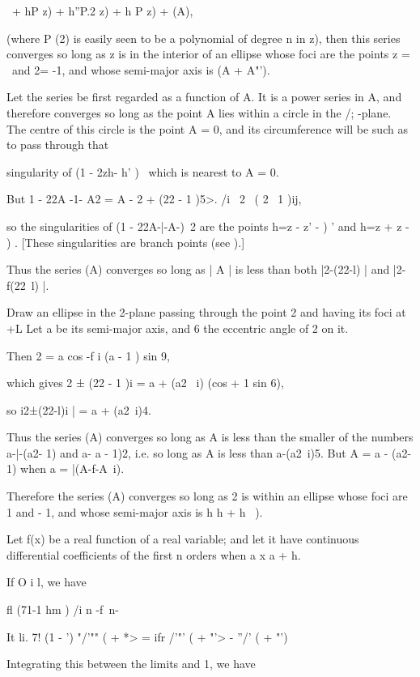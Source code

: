 {{\ + hP z) + h''P.2 z) + h P z) + (A),

(where P (2) is easily seen to be a polynomial of degree n in z), then
this series converges so long as z is in the interior of an ellipse
whose foci are the points z = \ and 2= -1, and whose semi-major axis
is (A + A"').

Let the series be first regarded as a function of A. It is a power
series in A, and therefore converges so long as the point A lies
within a circle in the /; -plane. The centre of this circle is the
point A = 0, and its circumference will be such as to pass through
that

singularity of (1 - 2zh- h' )~ which is nearest to A = 0.

But 1 - 22A -1- A2 = A - 2 + (22 - 1 )5>. /i \ 2 \ ( 2 \ 1 )ij,

so the singularities of (1 - 22A-|-A-)~2 are the points h=z - z' - ) '
and h=z + z - ) . [These singularities are branch points (see ).]

Thus the series (A) converges so long as | A | is less than both
|2-(22-l) | and |2-f(22\ l) |.

Draw an ellipse in the 2-plane passing through the point 2 and having
its foci at +L Let a be its semi-major axis, and 6 the eccentric angle
of 2 on it.

Then 2 = a cos -f i (a - 1 ) sin 9,

which gives 2 ± (22 - 1 )i = a + (a2 \ i) (cos + 1 sin 6),

so i2±(22-l)i | = a + (a2\ i)4.

Thus the series (A) converges so long as A is less than the smaller of
the numbers a-|-(a2- 1) and a- a - 1)2, i.e. so long as A is less than
a-(a2\ i)5. But A = a - (a2- 1) when a = |(A-f-A~i).

Therefore the series (A) converges so long as 2 is within an ellipse
whose foci are 1 and - 1, and whose semi-major axis is h h + h~ ).


Let f(x) be a real function of a real variable; and let it have
continuous differential coefficients of the first n orders when a x a
+ h.

If O i l, we have

fl (71-1 hm ) /i n -f\ n-\

It li. 7! (1 - ') "/'"" ( + *> = ifr /'"' ( + "'> - ''/' ( + "')

Integrating this between the limits and 1, we have

}}
